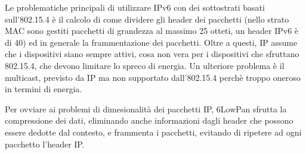 Le problematiche principali di utilizzare IPv6 con dei sottostrati basati 
sull'802.15.4 è il calcolo di come dividere gli header dei pacchetti (nello 
strato MAC sono gestiti pacchetti di grandezza al massimo 25 otteti, un header 
IPv6 è di 40) ed in generale la frammentazione dei pacchetti. Oltre a questi, IP 
assume che i dispositivi siano sempre attivi, cosa non vera per i dispositivi 
che sfruttano 802.15.4, che devono limitare lo spreco di energia. Un ulteriore 
problema è il multicast, previsto da IP ma non supportato dall'802.15.4 perchè 
troppo oneroso in termini di energia.

Per ovviare ai problemi di dimesionalità dei pacchetti IP, 6LowPan sfrutta la 
compressione dei dati, eliminando anche informazioni dagli header che possono 
essere dedotte dal contesto, e frammenta i pacchetti, evitando di ripetere ad 
ogni pacchetto l'header IP.